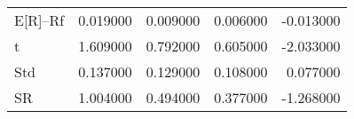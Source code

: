 \begin{tabular}{lrrrr}
\toprule
\midrule
E[R]--Rf & 0.019000 & 0.009000 & 0.006000 & -0.013000 \\
t & 1.609000 & 0.792000 & 0.605000 & -2.033000 \\
Std & 0.137000 & 0.129000 & 0.108000 & 0.077000 \\
SR & 1.004000 & 0.494000 & 0.377000 & -1.268000 \\
\bottomrule
\end{tabular}
